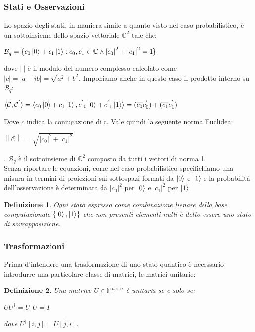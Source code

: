 \documentclass[12pt,a4paper,openright]{report}
\newcommand{\norm}[1]{\left\lVert#1\right\rVert}
\newtheorem{mydef}{Definizione}[chapter]
\begin{document}
\subsubsection{Stati e Osservazioni}

Lo spazio degli stati, in maniera simile a quanto visto nel caso probabilistico, è un sottoinsieme dello spazio vettoriale $\mathbb{C}^2$ tale che:
\begin{center}
    $\mathcal{B}_q=\{c_0\ket0 + c_1\ket1 : c_0,c_1 \in \mathbb{C} \land {\left\vert{c_0}\right\vert}^2 + {\left\vert{c_1}\right\vert}^2 = 1 \} $
\end{center}
dove $\left\vert{\:}\right\vert$ è il modulo del numero complesso calcolato come $\left\vert{c}\right\vert = \left\vert{a + ib}\right\vert = \sqrt{a^2 + b^2}$.
Imponiamo anche in questo caso il prodotto interno su $\mathcal{B}_q$:
\begin{center}
    $\langle\mathcal{C},\mathcal{C^{'}}\rangle=\langle c_0\ket0 + c_1\ket1, {c^{'}}_0\ket0 + {c^{'}}_1\ket1 \rangle = (\overline{c_0}c^{'}_0) + (\overline{c_1}c^{'}_1)$
\end{center}
Dove $\overline{c}$ indica la coniugazione di c. Vale quindi la seguente norma Euclidea:
\begin{center}
    $\norm{\mathcal{C}}= \sqrt{{\left\vert{c_0}\right\vert}^2 + {\left\vert{c_1}\right\vert}^2}$
\end{center}
. $\mathcal{B}_q$ è il sottoinsieme di $\mathbb{C}^2$ composto da tutti i vettori di norma 1.\\
Senza riportare le equazioni, come nel caso probabilistico specifichiamo una misura in termini di proiezioni sui sottospazi formati da $\ket0$ e $\ket1$ e la probabilità 
dell'osservazione è determinata da ${\left\vert{c_0}\right\vert}^2$ per $\ket0$ e  ${\left\vert{c_1}\right\vert}^2$ per $\ket1$.

\begin{mydef}
    Ogni stato espresso come combinazione lienare della base computazionale $\{\ket0,\ket1\}$ che non presenti elementi nulli è detto essere uno 
    stato di sovrapposizione.
\end{mydef}
\subsubsection{Trasformazioni}
Prima d'intendere una trasformazione di uno stato quantico è necessario introdurre una particolare classe di matrici, le matrici unitarie:
\begin{mydef}
    Una matrice $U\in\mathbb{M}^{n\times{n}}$ è unitaria se e solo se:
    \begin{center}
        $UU^\dag=U^{\dag}U=I$
    \end{center} 
    dove $U^{\dag}[i,j]=\overline{U[j,i]}$.
\end{mydef}
\end{document}
